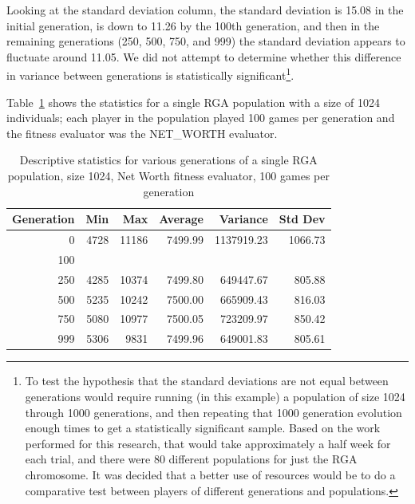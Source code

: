 Looking at the standard deviation column, the standard deviation is 15.08 in the
initial generation, is down to 11.26 by the 100th generation, and then in the
remaining generations (250, 500, 750, and 999) the standard deviation appears to
fluctuate around 11.05. We did not attempt to determine whether this difference
in variance between generations is statistically significant\footnote{To test
the hypothesis that the standard deviations are not equal between generations
would require running (in this example) a population of size 1024 through 1000
generations, and then repeating that 1000 generation evolution enough times to
get a statistically significant sample. Based on the work performed for this
research, that would take approximately a half week for each trial, and there
were 80 different populations for just the RGA chromosome. It was decided that a
better use of resources would be to do a comparative test between players of
different generations and populations.}.

Table~\ref{table-stats-for-s1024-n100-netw} shows the statistics for a single
RGA population with a size of 1024 individuals; each player in the population
played 100 games per generation and the fitness evaluator was the NET\_WORTH
evaluator.

\begin{table}[ht]
\begin{center}
\begin{tabular}{ | r || r | r | r | r | r |}
\hline                        
Generation & Min & Max & Average & Variance & Std Dev \\ \hline \hline
0   & 4728 & 11186 & 7499.99 & 1137919.23 & 1066.73 \\ \hline
100 & & & & & \\ \hline 
250 & 4285 & 10374 & 7499.80 &  649447.67 & 805.88 \\ \hline
500 & 5235 & 10242 & 7500.00 & 665909.43 & 816.03 \\ \hline
750 & 5080 & 10977 & 7500.05 & 723209.97 & 850.42 \\ \hline
999 & 5306 & 9831 & 7499.96 & 649001.83 & 805.61 \\ \hline
\end{tabular}
\caption{Descriptive statistics for various generations of a single RGA
population, size 1024, Net Worth fitness evaluator, 100 games per generation}
\label{table-stats-for-s1024-n100-netw}
\end{center}
\end{table}


